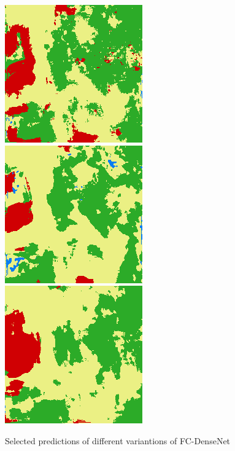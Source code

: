 \begin{figure}
    \includegraphics[width=\DensenetPredictionsImageWidth]{images/densenet/densenet-103/768909-prediction} \hfill
    \includegraphics[width=\DensenetPredictionsImageWidth]{images/densenet/densenet-67D/768909-prediction}
    \includegraphics[width=\DensenetPredictionsImageWidth]{images/densenet/densenet-56D/768909-prediction}

    \caption{Selected predictions of different variantions of FC-DenseNet}
    \label{fig:densenet_prediction_images}
\end{figure}

